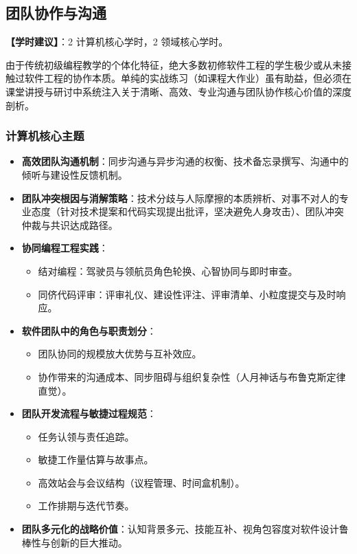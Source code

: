 \subsection{团队协作与沟通}
\textbf{【学时建议】}：2 计算机核心学时，2 领域核心学时。

由于传统初级编程教学的个体化特征，绝大多数初修软件工程的学生极少或从未接触过软件工程的协作本质。单纯的实战练习（如课程大作业）虽有助益，但必须在课堂讲授与研讨中系统注入关于清晰、高效、专业沟通与团队协作核心价值的深度剖析。

\subsubsection{计算机核心主题}
\begin{itemize}
    \item \textbf{高效团队沟通机制}：同步沟通与异步沟通的权衡、技术备忘录撰写、沟通中的倾听与建设性反馈机制。
    \item \textbf{团队冲突根因与消解策略}：技术分歧与人际摩擦的本质辨析、对事不对人的专业态度（针对技术提案和代码实现提出批评，坚决避免人身攻击）、团队冲突仲裁与共识达成路径。
    \item \textbf{协同编程工程实践}：
    \begin{itemize}
        \item 结对编程：驾驶员与领航员角色轮换、心智协同与即时审查。
        \item 同侪代码评审：评审礼仪、建设性评注、评审清单、小粒度提交与及时响应。
    \end{itemize}
    \item \textbf{软件团队中的角色与职责划分}：
    \begin{itemize}
        \item 团队协同的规模放大优势与互补效应。
        \item 协作带来的沟通成本、同步阻碍与组织复杂性（人月神话与布鲁克斯定律直觉）。
    \end{itemize}
    \item \textbf{团队开发流程与敏捷过程规范}：
    \begin{itemize}
        \item 任务认领与责任追踪。
        \item 敏捷工作量估算与故事点。
        \item 高效站会与会议结构（议程管理、时间盒机制）。
        \item 工作排期与迭代节奏。
    \end{itemize}
    \item \textbf{团队多元化的战略价值}：认知背景多元、技能互补、视角包容度对软件设计鲁棒性与创新的巨大推动。
\end{itemize}

